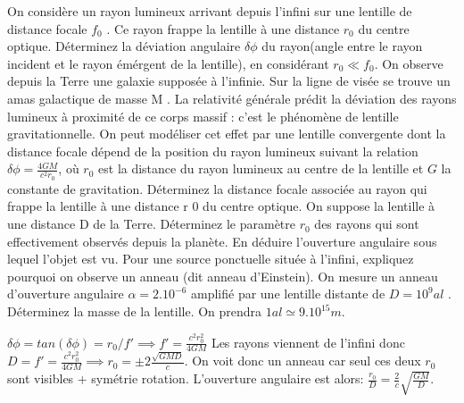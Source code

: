 \begin{Exercise}[title=Lentille Gravitationnelle]
 \Question On considère un rayon lumineux arrivant depuis l'infini sur une
 lentille de distance focale $f_0$ . Ce rayon frappe la lentille à une distance $r_0$ du centre optique. Déterminez la déviation angulaire $\delta\phi$
du rayon(angle entre le rayon incident et le rayon émérgent de la lentille), en considérant $r_0\ll f_0$.
\Question
On observe depuis la Terre une galaxie supposée à l'infinie. Sur la ligne de
visée se trouve un amas galactique de masse M . La relativité générale prédit la
déviation des rayons lumineux à proximité de ce corps massif : c'est le
phénomène de lentille gravitationnelle. On peut modéliser cet effet par une
lentille convergente dont la distance focale dépend de la position du rayon
lumineux suivant la relation $\delta\phi=\frac{4GM}{c^2r_0}$, où $r_0$ est la distance
du rayon lumineux au centre de la lentille et $G$ la constante de gravitation.
\subQuestion Déterminez la distance focale associée au rayon qui frappe la lentille à une distance r 0 du centre
optique.
\subQuestion On suppose la lentille à une distance D de la Terre. Déterminez le
paramètre $r_0$ des rayons qui sont effectivement observés depuis la planète.
\subQuestion En déduire l'ouverture angulaire sous lequel l'objet est vu. Pour
une source ponctuelle située à l'infini, expliquez pourquoi on observe un anneau
(dit anneau d'Einstein).
\subQuestion On mesure un anneau d'ouverture angulaire $\alpha = 2.10^{-6}$ amplifié par
une lentille distante de $D = 10^9 al$ . Déterminez la masse de la lentille. On
prendra $1al \simeq 9.10^{15} m$.
\end{Exercise}
\begin{Answer}
  $\delta\phi = tan(\delta\phi)  =r_0/f' \implies f' = \frac{c^2r_0^2}{4GM}$ Les rayons viennent
  de l'infini donc $D = f' = \frac{c^2r_0^2}{4GM} \implies r_0 = \pm 2
  \frac{\sqrt{GMD}}{c}$. On voit donc un anneau car seul ces deux $r_0$ sont
  visibles + symétrie rotation. L'ouverture angulaire est alors: $\frac{r_0}{D}= \frac{2}{c}\sqrt{\frac{GM}{D}}$.

\end{Answer}
